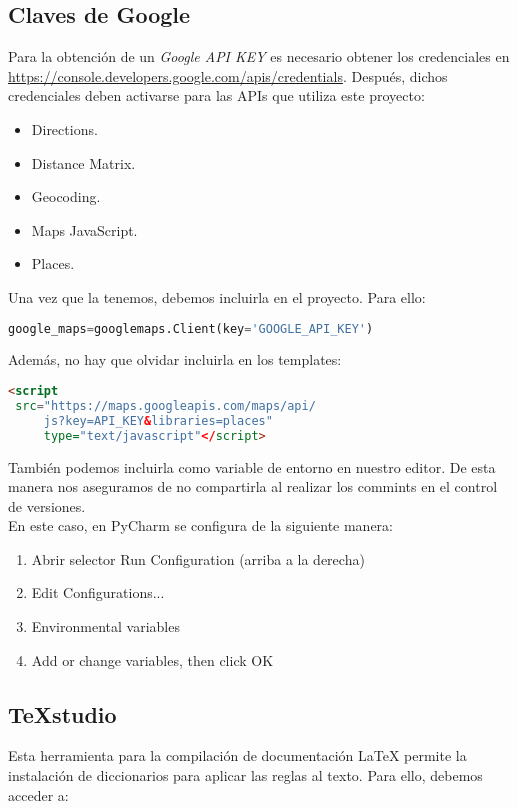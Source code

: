 \subsection{Claves de Google}
Para la obtención de un \textit{Google API KEY} es necesario obtener los credenciales en  \url{https://console.developers.google.com/apis/credentials}.
Después, dichos credenciales deben activarse para las APIs que utiliza este proyecto:
\begin{itemize}
	\item Directions.
	\item Distance Matrix.
	\item Geocoding.
	\item Maps JavaScript.
	\item Places.
\end{itemize}

Una vez que la tenemos, debemos incluirla en el proyecto. Para ello:

\begin{lstlisting}[language=python,caption={Añadir API\_KEY}]
google_maps=googlemaps.Client(key='GOOGLE_API_KEY')
\end{lstlisting}

Además, no hay que olvidar incluirla en los templates:
\begin{lstlisting}[language=html,caption={Añadir API\_KEY a los templates}]
<script
 src="https://maps.googleapis.com/maps/api/
	 js?key=API_KEY&libraries=places" 
	 type="text/javascript"</script>
\end{lstlisting}

También podemos incluirla como variable de entorno en nuestro editor. De esta manera nos aseguramos de no compartirla al realizar los commints en el control de versiones.
\\
En este caso, en PyCharm se configura de la siguiente manera:
\begin{enumerate}
\item Abrir selector Run Configuration (arriba a la derecha)
\item Edit Configurations...
\item Environmental variables
\item Add or change variables, then click OK 
\end{enumerate}
  
\subsection{\TeX studio}
Esta herramienta para la compilación de documentación \LaTeX{} permite la instalación de diccionarios para aplicar las reglas al texto. Para ello, debemos acceder a:

